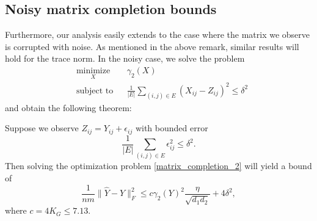 
\subsection{Noisy matrix completion bounds}

Furthermore, our analysis easily extends to the case where
the matrix we observe is corrupted with noise. 
As mentioned in the above remark, similar results will hold for the trace norm.
In the noisy case, we solve the problem
\begin{equation}
\label{matrix_completion_2}
\begin{aligned}
& \underset{X}{\text{minimize}}
& & \gamma_2(X) \\
& \text{subject to}
& & \frac{1}{|E|} \sum_{(i,j) \in E} ( X_{ij} - Z_{ij})^2 \leq \delta^2
\end{aligned}
\end{equation}
and obtain the following theorem:
\begin{theorem}
Suppose we observe $Z_{ij} = Y_{ij} + \epsilon_{ij}$ with bounded error
\[
 \frac{1}{|E|} \sum_{(i,j) \in E} \epsilon_{ij}^2 \leq \delta^2 .
\]
Then solving the optimization problem \eqref{matrix_completion_2}
will yield a bound of
\[
\frac{1}{n m} \| \hat{Y} - Y \|_F^2 \leq 
      c \gamma_2(Y)^2 \frac{\eta}{\sqrt{d_1 d_2}} + 4 \delta^2,
\]
where $c = 4 K_G \leq 7.13$.
\end{theorem}

